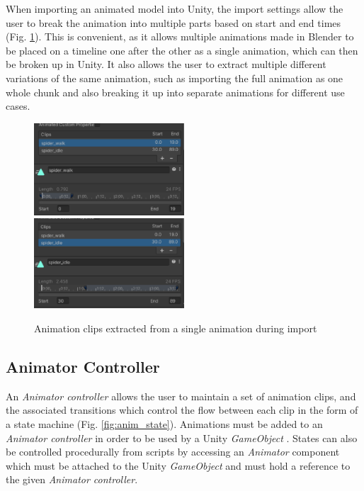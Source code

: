 When importing an animated model into Unity, the import settings allow the user
to break the animation into multiple parts based on start and end times (Fig.
\ref{fig:anim_chunk}). This is convenient, as it allows multiple animations made
in Blender to be placed on a timeline one after the other as a single
animation, which can then be broken up in Unity. It also allows the user to
extract multiple different variations of the same animation, such as importing
the full animation as one whole chunk and also breaking it up into separate
animations for different use cases.

\begin{figure}
    \includegraphics[width=0.5\textwidth]{grafika/animation_chunk_1.eps}
    \includegraphics[width=0.5\textwidth]{grafika/animation_chunk_2.eps}
    \caption{Animation clips extracted from a single animation during import}
    \label{fig:anim_chunk}
\end{figure}

\subsection{Animator Controller}
An \textit{Animator controller} allows the user to maintain a set of animation
clips, and the associated transitions which control the flow between each clip
in the form of a state machine (Fig. \ref{fig:anim_state}). Animations must be
added to an \textit{Animator controller} in order to be used by a Unity
\textit{GameObject} \cite{unity_animator}. States can also be controlled
procedurally from scripts by accessing an \textit{Animator} component which must
be attached to the Unity \textit{GameObject} and must hold a reference to the
given \textit{Animator controller}.
 
